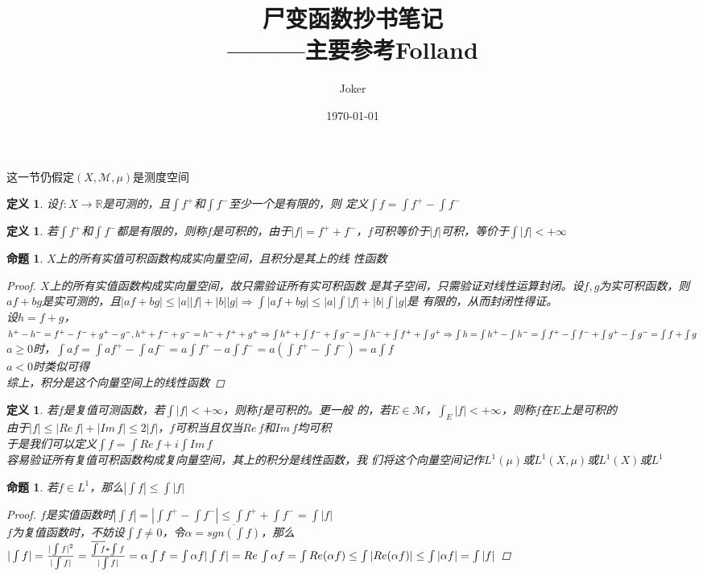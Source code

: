 \documentclass[12pt, a4paper, oneside]{ctexbook}
\title{{\Huge{\textbf{尸变函数抄书笔记}}}\\———主要参考Folland}
\author{Joker}
\date{\today}
\newtheorem{definition}[theorem]{定义}
\newtheorem{proposition}[theorem]{命题}
\begin{document}
这一节仍假定$(X,\mathcal{M},\mu)$是测度空间
\begin{definition}
    设$f:X\to \mathbb{R}$是可测的，且$\int f^+$和$\int f^-$至少一个是有限的，则
    定义$\int f=\int f^+-\int f^-$
\end{definition}
\begin{definition}
    若$\int f^+$和$\int f^-$都是有限的，则称$f$是可积的，由于$|f|=f^++
    f^-$，$f$可积等价于$|f|$可积，等价于$\int |f|<+\infty$
\end{definition}
\begin{proposition}
    $X$上的所有实值可积函数构成实向量空间，且积分是其上的线
    性函数
    \begin{proof}
        $X$上的所有实值函数构成实向量空间，故只需验证所有实可积函数
        是其子空间，只需验证对线性运算封闭。设$f,g$为实可积函数，则
        $af+bg$是实可测的，且$|af+bg|\leq|a||f|+|b||g|\Rightarrow \int |af+bg|\leq |a|\int |f|+|b|\int |g|$是
        有限的，从而封闭性得证。\\
        设$h=f+g$，$h^+-h^-=f^+-f^-+g^+-g^-,\\
        h^++f^-+g^-=h^-+f^++g^+\\
        \Rightarrow \int h^++\int f^-+\int g^-=\int h^-+\int f^++\int g^+\\
        \Rightarrow \int h=\int h^+-\int h^-=\int f^+-\int f^-+\int g^+-\int g^-=\int f+\int g$\\
        $a\geq 0$时，$\int af=\int af^+-\int af^-=a\int f^+-a\int f^-=a(\int f^+-\int f^-)=a\int f $\\
        $a<0$时类似可得\\
        综上，积分是这个向量空间上的线性函数
    \end{proof}
\end{proposition}
\begin{definition}
    若$f$是复值可测函数，若$\int |f|<+\infty$，则称$f$是可积的。更一般
    的，若$E\in\mathcal{M}$，$\int_E|f|<+\infty$，则称$f$在$E$上是可积的\\
    由于$|f|\leq|Re\,f|+|Im\,f|\leq2|f|$，$f$可积当且仅当$Re\,f$和$Im\,f$均可积\\
    于是我们可以定义$\int f=\int Re\,f+i\int Im\,f$\\
    容易验证所有复值可积函数构成复向量空间，其上的积分是线性函数，我
    们将这个向量空间记作$L^1(\mu)$或$L^1(X,\mu)$或$L^1(X)$或$L^1$
\end{definition}
\begin{proposition}
    若$f\in L^1$，那么$|\int f|\leq\int |f|$
    \begin{proof}
        $f$是实值函数时$|\int f|=|\int f^+-\int f^-|\leq\int f^++\int f^-=\int |f|$\\
        $f$为复值函数时，不妨设$\int f\neq 0$，令$\alpha=\overline{sgn(\int f)}$，那么$|\int f|=\frac{|\int f|^2}{|\int f|}
        =\frac{\overline{\int f}*\int f}{|\int f|}=\alpha\int f=\int \alpha f\\
        |\int f|=Re\,\int \alpha f=\int Re(\alpha f)\leq\int|Re(\alpha f)|\leq\int|\alpha f|=\int|f|$
    \end{proof}
\end{proposition}
\end{document}
